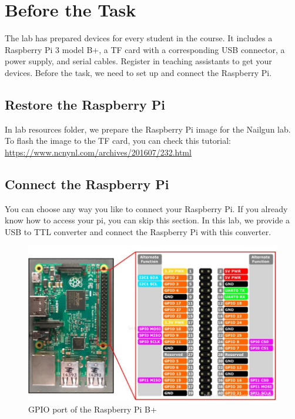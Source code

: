 
\section{Before the Task}

The lab has prepared devices for every student in the course. It includes a Raspberry Pi 3 model B+, a TF card with a corresponding USB connector, a power supply, and serial cables. Register in teaching assistants to get your devices. Before the task, we need to set up and connect the Raspberry Pi.

\subsection{Restore the Raspberry Pi}

In lab resources folder, we prepare the Raspberry Pi image for the Nailgun lab. To flash the image to the TF card, you can check this tutorial: \url{https://www.ncnynl.com/archives/201607/232.html}

\subsection{Connect the Raspberry Pi}
You can choose any way you like to connect your Raspberry Pi. If you already know how to access your pi, you can skip this section. In this lab, we provide a USB to TTL converter and connect the Raspberry Pi with this converter.

\begin{figure}[h]
  \centering
  \includegraphics[scale=.50]{GPIO.jpg}
  \caption{GPIO port of the Raspberry Pi B+}
  \label{fig:GPIO}
\end{figure}

